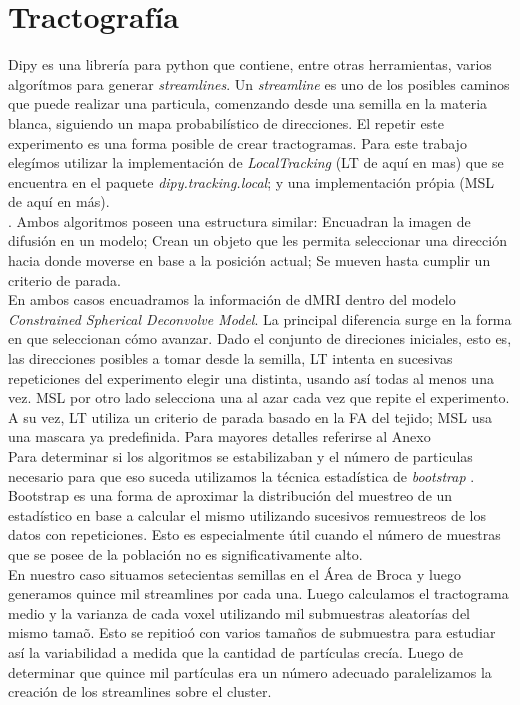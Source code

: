 \section{Tractograf\'ia}

Dipy es una librer\'ia para python que contiene, entre otras herramientas,
varios algor\'itmos para generar \textit{streamlines}. Un \textit{streamline} es
uno de los posibles caminos que puede realizar una particula, comenzando desde una
semilla en la materia blanca, siguiendo un mapa probabil\'istico de direcciones.
El repetir este experimento es una forma posible de crear tractogramas. Para este
trabajo eleg\'imos utilizar la implementaci\'on de \textit{LocalTracking} (LT de
aqu\'i en mas) que se encuentra en el paquete \textit{dipy.tracking.local}; y 
una implementaci\'on pr\'opia (MSL de aqu\'i en m\'as).\\ . Ambos algoritmos
poseen una estructura similar: Encuadran la imagen de difusi\'on en un modelo;
Crean un objeto que les permita seleccionar una direcci\'on hacia donde moverse
en base a la posici\'on actual; Se mueven hasta cumplir un criterio de parada.\\

En ambos casos encuadramos la informaci\'on de dMRI dentro del modelo
\textit{Constrained Spherical Deconvolve Model}. La principal diferencia surge
en la forma en que seleccionan c\'omo avanzar. Dado el conjunto de direciones 
iniciales, esto es, las direcciones posibles a tomar desde la semilla,
LT intenta en sucesivas repeticiones del experimento elegir una distinta, 
usando as\'i todas al menos una vez. MSL por otro lado selecciona una al
azar cada vez que repite el experimento. A su vez, LT utiliza un criterio de 
parada basado en la FA del tejido; MSL usa una mascara ya predefinida. Para 
mayores detalles referirse al Anexo\\

Para determinar si los algoritmos se estabilizaban y el n\'umero de particulas
necesario para que eso suceda utilizamos la t\'ecnica estad\'istica de
\textit{bootstrap} \cite{Efron1982}. Bootstrap es una forma de aproximar la
distribuci\'on del muestreo de un estad\'istico en base a calcular el mismo
utilizando sucesivos remuestreos de los datos con repeticiones. Esto es
especialmente \'util cuando el n\'umero de muestras que se posee de la poblaci\'on
no es significativamente alto. \\

En nuestro caso situamos setecientas semillas en el \'Area de Broca y luego
generamos quince mil streamlines por cada una. Luego calculamos el tractograma
medio y la varianza de cada voxel utilizando mil submuestras aleator\'ias del
mismo tama\~o. Esto se repitio\'o con varios tama\~nos de submuestra para estudiar
as\'i la variabilidad a medida que la cantidad de part\'iculas crec\'ia. Luego 
de determinar que quince mil part\'iculas era un n\'umero adecuado paralelizamos
la creaci\'on de los streamlines sobre el cluster.\\

